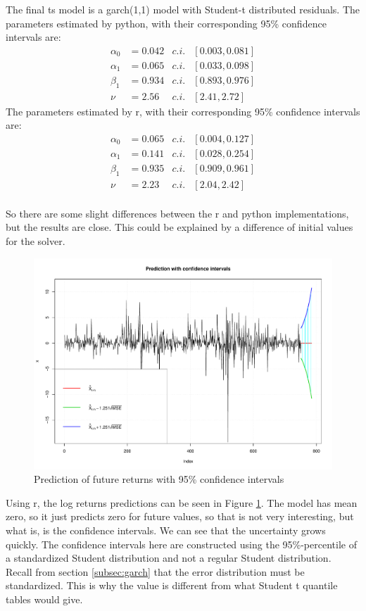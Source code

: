 The final \acrshort{ts} model is a \acrshort{garch}(1,1) model with Student-t distributed residuals. The parameters estimated by \Gls{python}, with their corresponding 95\% confidence intervals are:
\begin{align*}
\alpha_0 &= 0.042 & c.i. & [0.003, 0.081] \\
\alpha_1 &= 0.065 & c.i. & [0.033, 0.098]\\
\beta_1 &= 0.934 & c.i. & [0.893, 0.976]\\
\nu &= 2.56 & c.i. & [2.41, 2.72]
\end{align*}
The parameters estimated by \Gls{r}, with their corresponding 95\% confidence intervals are:
\begin{align*}
\alpha_0 &= 0.065 & c.i. & [0.004,0.127] \\
\alpha_1 &= 0.141 & c.i. & [0.028,0.254]\\
\beta_1 &= 0.935 & c.i. & [0.909,0.961]\\
\nu &= 2.23 & c.i. & [2.04,2.42] \\
\end{align*}

So there are some slight differences between the \Gls{r} and \Gls{python} implementations, but the results are close. This could be explained by a difference of initial values for the solver.

\begin{figure}
	\centering
	\includegraphics[width=\textwidth]{img/TSpred_ci.pdf}
	\caption{Prediction of future returns with 95\% confidence intervals}
	\label{fig:garch_pred}
\end{figure}

Using \Gls{r}, the log returns predictions can be seen in Figure \ref{fig:garch_pred}. The model has mean zero, so it just predicts zero for future values, so that is not very interesting, but what is, is the confidence intervals. We can see that the uncertainty grows quickly.
The confidence intervals here are constructed using the 95\%-percentile of a standardized Student distribution and not a regular Student distribution. Recall from section \ref{subsec:garch} that the error distribution must be standardized. This is why the value is different from what Student t quantile tables would give.


